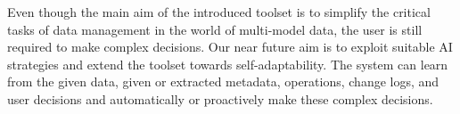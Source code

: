 Even though the main aim of the introduced toolset is to simplify the critical tasks of data management in the world of multi-model data, the user is still required to make complex decisions. Our near future aim is to exploit suitable AI strategies and extend the toolset towards self-adaptability. The system can learn from the given data, given or extracted metadata, operations, change logs, and user decisions and automatically or proactively make these complex decisions.

% 
% 

% 
